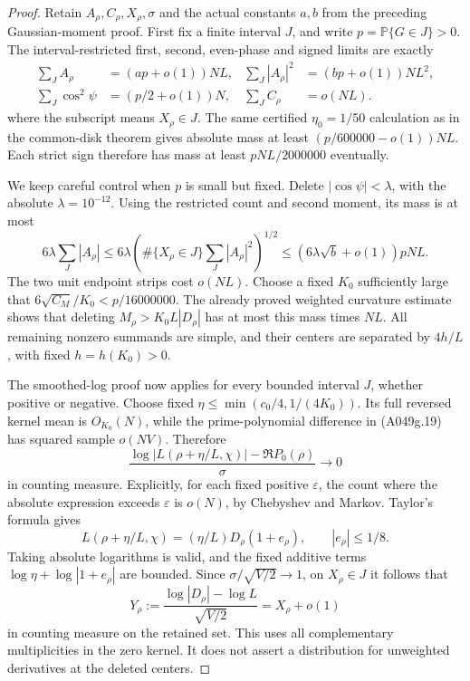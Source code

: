 \begin{proof}
Retain $A_\rho,C_\rho,X_\rho,\sigma$ and the actual constants
$a,b$ from the preceding Gaussian-moment proof. First fix a
finite interval $J$, and write $p=\mathbb P\{G\in J\}>0$.
The interval-restricted first, second, even-phase and signed
limits are exactly
\[
 \begin{aligned}
 \sum_J A_\rho&=(ap+o(1))NL,&
 \sum_J|A_\rho|^2&=(bp+o(1))NL^2,\\
 \sum_J\cos^2\psi&=(p/2+o(1))N,&
 \sum_JC_\rho&=o(NL).
 \end{aligned}
\]
where the subscript means $X_\rho\in J$. The same certified
$\eta_0=1/50$ calculation as in the common-disk theorem gives
absolute mass at least $(p/600000-o(1))NL$. Each strict
sign therefore has mass at least $pNL/2000000$ eventually.

We keep careful control when $p$ is small but fixed. Delete
$|\cos\psi|<\lambda$, with the absolute $\lambda=10^{-12}$.
Using the restricted count and second moment, its mass is at
most
\[
 6\lambda\sum_J|A_\rho|
 \le6\lambda\left(\#\{X_\rho\in J\}
                           \sum_J|A_\rho|^2\right)^{1/2}
                      \le(6\lambda\sqrt b+o(1))pNL.
\]
The two unit endpoint strips cost $o(NL)$. Choose a fixed
$K_0$ sufficiently large that
$6\sqrt{C_M}/K_0<p/16000000$. The already proved weighted
curvature estimate shows that deleting
$M_\rho>K_0L|D_\rho|$ has at most this mass times $NL$.
All remaining nonzero summands are simple, and their centers
are separated by $4h/L$, with fixed $h=h(K_0)>0$.

The smoothed-log proof now applies for every bounded interval
$J$, whether positive or negative. Choose fixed
$\eta\le\min(c_0/4,1/(4K_0))$. Its full reversed kernel mean
is $O_{K_0}(N)$, while the prime-polynomial difference in
(A049g.19) has squared sample $o(NV)$. Therefore
\[
 \frac{\log|L(\rho+\eta/L,\chi)|-\Re P_0(\rho)}{\sigma}
                                                        \longrightarrow0
\]
in counting measure. Explicitly, for each fixed positive
$\varepsilon$, the count where the absolute expression
exceeds $\varepsilon$ is $o(N)$, by Chebyshev and Markov.
Taylor's formula gives
\[
 L(\rho+\eta/L,\chi)
     =(\eta/L)D_\rho(1+e_\rho),\qquad |e_\rho|\le1/8.
\]
Taking absolute logarithms is valid, and the fixed additive
terms $\log\eta+\log|1+e_\rho|$ are bounded. Since
$\sigma/\sqrt{V/2}\to1$, on $X_\rho\in J$ it follows that
\[
 Y_\rho:=\frac{\log|D_\rho|-\log L}{\sqrt{V/2}}
                          =X_\rho+o(1)
\tag{A049v.3}
\]
in counting measure on the retained set. This uses all
complementary multiplicities in the zero kernel. It does
not assert a distribution for unweighted derivatives at
the deleted centers.


\end{proof}
